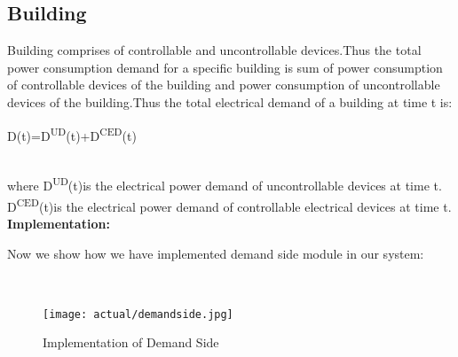 \documentclass[runningheads]{llncs}
\begin{document}
\subsection{Building}
Building comprises of controllable and uncontrollable devices.Thus the total power consumption demand for a specific building is  sum of power consumption of controllable devices of the building  and power consumption of  uncontrollable devices of the building.Thus  the total electrical demand of a building at time t is:\\
\centerline{D(t)=D\textsuperscript{UD}(t)+D\textsuperscript{CED}(t)}\\
where D\textsuperscript{UD}(t)is the electrical power demand of uncontrollable devices at time t.\\
D\textsuperscript{CED}(t)is the electrical power demand of controllable electrical devices at time t.\\
\textbf{Implementation:}\\
\centerline {Now we show how we have implemented demand side module in our system:}\\
\begin{figure}[H]
\centering
\texttt{[image: actual/demandside.jpg]}
\caption{Implementation of Demand Side} 
\label{fig3}
\end{figure}
\end{document}
